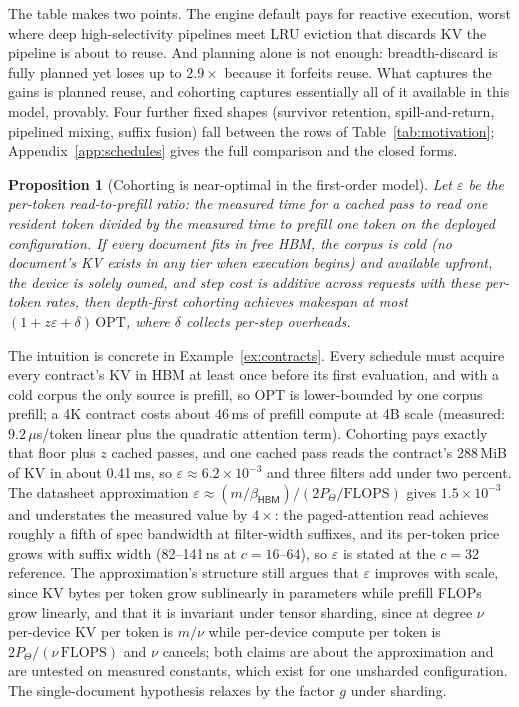\documentclass[10pt,twocolumn]{article}
\newtheorem{proposition}{Proposition}
\newcommand{\hbm}{\mathsf{HBM}}
\newcommand{\eps}{\varepsilon}
\begin{document}
The table makes two points. The engine default pays for reactive execution, worst where deep high-selectivity pipelines meet LRU eviction that discards KV the pipeline is about to reuse. And planning alone is not enough: breadth-discard is fully planned yet loses up to $2.9\times$ because it forfeits reuse. What captures the gains is planned reuse, and cohorting captures essentially all of it available in this model, provably. Four further fixed shapes (survivor retention, spill-and-return, pipelined mixing, suffix fusion) fall between the rows of Table~\ref{tab:motivation}; Appendix~\ref{app:schedules} gives the full comparison and the closed forms.

\begin{proposition}[Cohorting is near-optimal in the first-order model]
\label{prop:cohort}
Let $\eps$ be the per-token read-to-prefill ratio: the measured time for a cached pass to read one resident token divided by the measured time to prefill one token on the deployed configuration. If every document fits in free HBM, the corpus is cold (no document's KV exists in any tier when execution begins) and available upfront, the device is solely owned, and step cost is additive across requests with these per-token rates, then depth-first cohorting achieves makespan at most $(1 + z\eps + \delta)\,\mathrm{OPT}$, where $\delta$ collects per-step overheads.
\end{proposition}

The intuition is concrete in Example~\ref{ex:contracts}. Every schedule must acquire every contract's KV in HBM at least once before its first evaluation, and with a cold corpus the only source is prefill, so $\mathrm{OPT}$ is lower-bounded by one corpus prefill; a 4K contract costs about 46\,ms of prefill compute at 4B scale (measured: $9.2\,\mu$s/token linear plus the quadratic attention term). Cohorting pays exactly that floor plus $z$ cached passes, and one cached pass reads the contract's 288\,MiB of KV in about 0.41\,ms, so $\eps \approx 6.2 \times 10^{-3}$ and three filters add under two percent. The datasheet approximation $\eps \approx (m/\beta_{\hbm})/(2P_{\Theta}/\mathrm{FLOPS})$ gives $1.5 \times 10^{-3}$ and understates the measured value by $4\times$: the paged-attention read achieves roughly a fifth of spec bandwidth at filter-width suffixes, and its per-token price grows with suffix width (82--141\,ns at $c = 16$--$64$), so $\eps$ is stated at the $c{=}32$ reference. The approximation's structure still argues that $\eps$ improves with scale, since KV bytes per token grow sublinearly in parameters while prefill FLOPs grow linearly, and that it is invariant under tensor sharding, since at degree $\nu$ per-device KV per token is $m/\nu$ while per-device compute per token is $2P_{\Theta}/(\nu\,\mathrm{FLOPS})$ and $\nu$ cancels; both claims are about the approximation and are untested on measured constants, which exist for one unsharded configuration. The single-document hypothesis relaxes by the factor $g$ under sharding.
\end{document}
